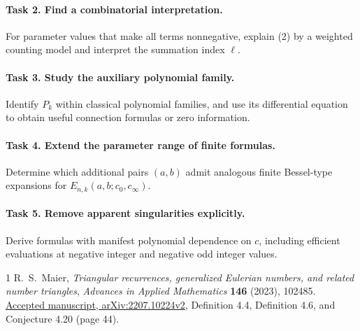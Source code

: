 \documentclass[10pt]{article}
\begin{document}
\newpage
\paragraph{Task 2. Find a combinatorial interpretation.}
For parameter values that make all terms nonnegative, explain (2) by
a weighted counting model and interpret the summation index \(\ell\).

\paragraph{Task 3. Study the auxiliary polynomial family.}
Identify \(P_k\) within classical polynomial families, and use its
differential equation to obtain useful connection formulas or zero information.

\paragraph{Task 4. Extend the parameter range of finite formulas.}
Determine which additional pairs \((a,b)\) admit analogous finite
Bessel-type expansions for \(E_{n,k}(a,b;c_0,c_\infty)\).

\paragraph{Task 5. Remove apparent singularities explicitly.}
Derive formulas with manifest polynomial dependence on \(c\), including
efficient evaluations at negative integer and negative odd integer values.

\begin{thebibliography}{1}
R.~S.~Maier, \emph{Triangular recurrences, generalized Eulerian numbers,
and related number triangles}, \emph{Advances in Applied Mathematics}
\textbf{146} (2023), 102485.
\href{https://arxiv.org/abs/2207.10224v2}{Accepted manuscript,
arXiv:2207.10224v2}, Definition 4.4, Definition 4.6,
and Conjecture 4.20 (page 44).
\end{thebibliography}
\end{document}
